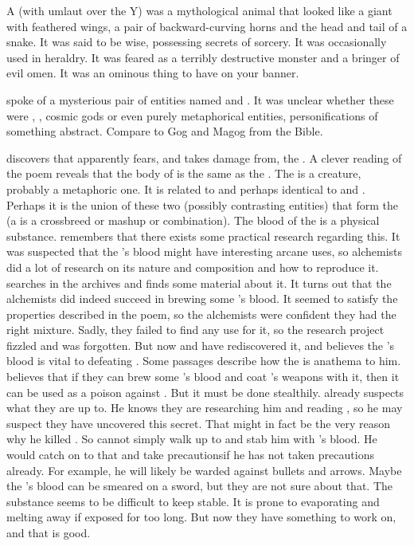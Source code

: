 A \malgryph (with umlaut over the Y) was a mythological animal that looked like a giant \nycan with feathered wings, a pair of backward-curving horns and the head and tail of a snake.
It was said to be wise, possessing secrets of sorcery.
It was occasionally used in heraldry. 
It was feared as a terribly destructive monster and a bringer of evil omen.
It was an ominous thing to have on your banner.

\WanderersInDarknessEmph spoke of a mysterious pair of entities named \Zaz and \Urzaz. 
It was unclear whether these were \dragons, \xss, cosmic gods or even purely metaphorical entities, personifications of something abstract.
Compare to Gog and Magog from the Bible.

\Urizeth discovers that \Ishnaruchaefir apparently fears, and takes damage from, the . 
A clever reading of the poem reveals that the body of \Zaz is the same as the . 
The \Chimaera is a creature, probably a metaphoric one. 
It is related to and perhaps identical to \Zaz and \Urzaz.
Perhaps it is the union of these two (possibly contrasting entities) that form the \Chimaera (a \chimaera is a crossbreed or mashup or combination). 
The blood of the \Chimaera is a physical substance.
\Urizeth remembers that there exists some practical research regarding this.
It was suspected that the \Chimaera's blood might have interesting arcane uses, so alchemists did a lot of research on its nature and composition and how to reproduce it.
\Urizeth searches in the archives and finds some material about it.
It turns out that the alchemists did indeed succeed in brewing some \Chimaera's blood.
It seemed to satisfy the properties described in the poem, so the alchemists were confident they had the right mixture.
Sadly, they failed to find any use for it, so the research project fizzled and was forgotten.
But now \Urizeth and \Teshrial have rediscovered it, and \Urizeth believes the \Chimaera's blood is vital to defeating \Ishnaruchaefir.
Some \WanderersInDarknessEmph passages describe how the  is anathema to him.
\Urizeth believes that if they can brew some \Chimaera's blood and coat \Teshrial's weapons with it, then it can be used as a poison against \Ishnaruchaefir.
But it must be done stealthily. 
\Ishnaruchaefir already suspects what they are up to.
He knows they are researching him and reading \WanderersInDarknessEmph, so he may suspect they have uncovered this secret. 
That might in fact be the very reason why he killed \Urizeth.
So \Teshrial cannot simply walk up to \Ishnaruchaefir and stab him with \Chimaera's blood. 
He would catch on to that and take precautions\dash{}if he has not taken precautions already.
For example, he will likely be warded against bullets and arrows. 
Maybe the \Chimaera's blood can be smeared on a sword, but they are not sure about that. 
The substance seems to be difficult to keep stable.
It is prone to evaporating and melting away if exposed for too long.
But now they have something to work on, and that is good.

